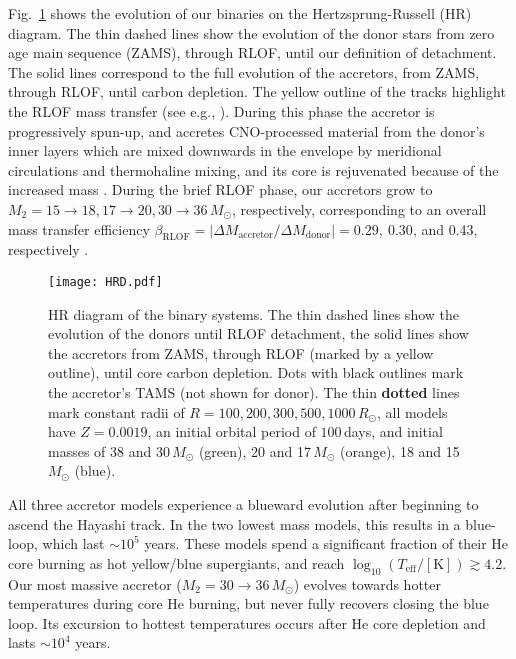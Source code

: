 \documentclass[twocolumn,twocolappendix,trackchanges]{aastex63}
\DeclareRobustCommand{\Figref}[1]{Fig.~\ref{#1}}
\begin{document}
\Figref{fig:HRD} shows the evolution of our binaries on the
Hertzsprung-Russell (HR) diagram. The thin dashed lines show the
evolution of the donor stars \citep[e.g.,][]{morton:60, gotberg:2018,
  laplace:2021} from zero age main sequence (ZAMS), through RLOF,
until our definition of detachment. The solid lines correspond to the
full evolution of the accretors, from ZAMS, through RLOF, until carbon
depletion. The yellow outline of the tracks highlight the RLOF mass
transfer (see e.g., \citealt{renzo:2021zoph}). During this phase the
accretor is progressively spun-up, and accretes CNO-processed material
from the donor's inner layers which are mixed downwards in the
envelope by meridional circulations and thermohaline mixing, and its
core is rejuvenated because of the increased mass \citep[see
also][]{sravan:2019, renzo:2021zoph, wang:2020}. During the brief RLOF
phase, our accretors grow to
$M_2=15\rightarrow 18, 17\rightarrow 20, 30\rightarrow 36\,M_\odot$,
respectively, corresponding to an overall mass transfer efficiency
$\beta_\mathrm{RLOF}=|\Delta M_\mathrm{accretor}/\Delta M_\mathrm{donor}| = 0.29,\ 0.30,$\,and
0.43, respectively \citep[see discussion in ][]{renzo:2021zoph}.

\begin{figure}[tbp]
  \texttt{[image: HRD.pdf]}
  \caption{HR diagram of the binary systems. The thin dashed lines
    show the evolution of the donors until RLOF detachment, the solid
    lines show the accretors from ZAMS, through RLOF (marked by a
    yellow outline), until core carbon depletion. Dots with black
    outlines mark the accretor's TAMS (not shown for donor). The thin
    \textcolor{green!80!black}{\bf dotted} lines mark constant radii of
    $R=100, 200, 300, 500, 1000\,R_\odot$, all models have $Z=0.0019$,
    an initial orbital period of $100$\,days, and initial masses of 38
    and 30\,$M_\odot$ (green), 20 and 17\,$M_\odot$ (orange), 18 and
    15\,$M_\odot$ (blue).}
  \label{fig:HRD}
\end{figure}

All three accretor models experience a blueward evolution after
beginning to ascend the Hayashi track. In the two lowest mass models,
this results in a blue-loop, which last $\sim{}10^5$ years. These
models spend a significant fraction of their He core burning as hot
yellow/blue supergiants, and reach
$\log_{10}(T_\mathrm{eff}/\mathrm{[K]})\gtrsim 4.2$. Our most massive
accretor ($M_2=30\rightarrow 36\,M_\odot$) evolves towards hotter
temperatures during core He burning, but never fully recovers closing
the blue loop. Its excursion to hottest temperatures occurs after He
core depletion and lasts $\sim{}10^{4}$ years.
\end{document}
